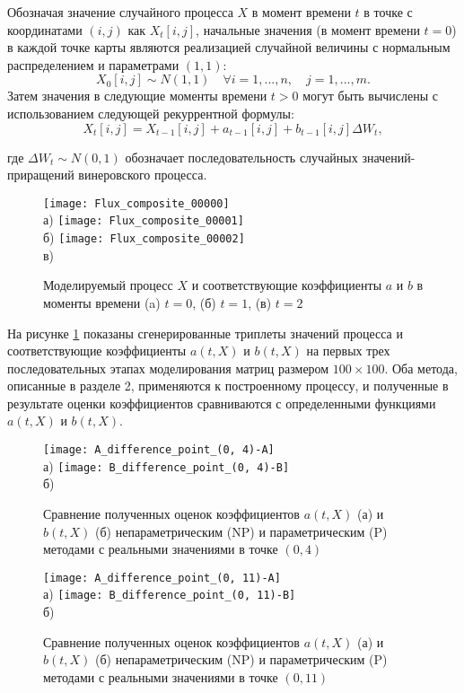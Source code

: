 Обозначая значение случайного процесса $X$ в момент времени $t$ в точке с координатами $(i,j)$ как $X_t[i,j]$, начальные значения (в момент времени $t=0$) в каждой точке карты являются реализацией случайной величины с нормальным распределением и параметрами $(1, 1)$:
$$
X_0[i,j] \sim N(1,1) \quad \forall i=1,...,n, \quad j=1,...,m.
$$
Затем значения в следующие моменты времени $t>0$ могут быть вычислены с использованием следующей рекуррентной формулы:
$$
X_t [i,j]= X_{t-1}[i,j] + a_{t-1} [i,j] + b_{t-1}[i,j]\Delta W_t,
$$

где $\Delta W_t \sim N(0,1)$ обозначает последовательность случайных значений-приращений винеровского процесса.

\begin{figure}[!h]
	\centering
	\texttt{[image: Flux\_composite\_00000]}\\
	а)
	\texttt{[image: Flux\_composite\_00001]}\\
	б)
	\texttt{[image: Flux\_composite\_00002]}\\
	в)
	\caption{Моделируемый процесс $X$ и соответствующие коэффициенты $a$ и $b$ в моменты времени (a) $t=0$, (б) $t=1$, (в) $t=2$}
	\label{flux_simulation}
\end{figure}

На рисунке \ref{flux_simulation} показаны сгенерированные триплеты значений процесса и соответствующие коэффициенты $a(t,X)$ и $b(t,X)$ на первых трех последовательных этапах моделирования матриц размером $100 \times 100$. Оба метода, описанные в разделе 2, применяются к построенному процессу, и полученные в результате оценки коэффициентов сравниваются с определенными функциями $a(t,X)$ и $b(t,X)$.

\begin{figure}[!h]
	\centering
	\texttt{[image: A\_difference\_point\_(0, 4)-A]}\\
	а)
	\texttt{[image: B\_difference\_point\_(0, 4)-B]}\\
	б)
	\caption{Сравнение полученных оценок коэффициентов $a(t,X)$ (а) и $b(t,X)$ (б) непараметрическим (NP) и параметрическим (P) методами с реальными значениями в точке $(0,4)$}
	\label{difference_0_4}
\end{figure}

\begin{figure}[!h]
	\centering
	\texttt{[image: A\_difference\_point\_(0, 11)-A]}\\
	а)
	\texttt{[image: B\_difference\_point\_(0, 11)-B]}\\
	б)
	\caption{Сравнение полученных оценок коэффициентов $a(t,X)$ (а) и $b(t,X)$ (б) непараметрическим (NP) и параметрическим (P) методами с реальными значениями в точке $(0,11)$}
	\label{difference_0_11}
\end{figure}

